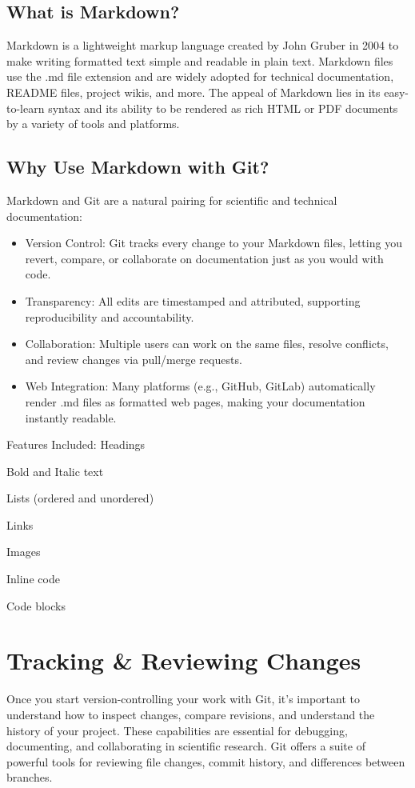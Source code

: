 \subsection*{What is Markdown?}
Markdown is a lightweight markup language created by John Gruber in 2004 to make writing formatted text simple and readable in plain text. Markdown files use the .md file extension and are widely adopted for technical documentation, README files, project wikis, and more. The appeal of Markdown lies in its easy-to-learn syntax and its ability to be rendered as rich HTML or PDF documents by a variety of tools and platforms.

\subsection*{Why Use Markdown with Git?}
Markdown and Git are a natural pairing for scientific and technical documentation:
\begin{itemize}
\item Version Control: Git tracks every change to your Markdown files, letting you revert, compare, or collaborate on documentation just as you would with code.

\item Transparency: All edits are timestamped and attributed, supporting reproducibility and accountability.

\item Collaboration: Multiple users can work on the same files, resolve conflicts, and review changes via pull/merge requests.

\item Web Integration: Many platforms (e.g., GitHub, GitLab) automatically render .md files as formatted web pages, making your documentation instantly readable.
\end{itemize}


Features Included:
Headings

Bold and Italic text

Lists (ordered and unordered)

Links

Images

Inline code

Code blocks
\section{Tracking \& Reviewing Changes}
Once you start version-controlling your work with Git, it's important to understand how to inspect changes, compare revisions, and understand the history of your project. These capabilities are essential for debugging, documenting, and collaborating in scientific research. Git offers a suite of powerful tools for reviewing file changes, commit history, and differences between branches.

